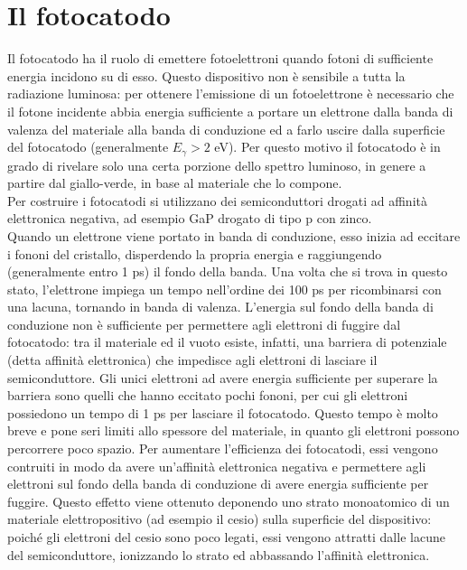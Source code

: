 \section{Il fotocatodo}
Il fotocatodo ha il ruolo di emettere fotoelettroni quando fotoni di sufficiente energia incidono su di esso.
Questo dispositivo non \`e sensibile a tutta la radiazione luminosa: 
per ottenere l'emissione di un fotoelettrone \`e necessario che il fotone incidente
abbia energia sufficiente a portare un elettrone dalla banda di valenza del materiale alla
banda di conduzione ed a farlo uscire dalla superficie del fotocatodo (generalmente $E_{\gamma} > 2$ eV).
Per questo motivo il fotocatodo \`e in grado di rivelare solo una certa porzione dello spettro
luminoso, in genere a partire dal giallo-verde, in base al materiale che lo compone. \\
Per costruire i fotocatodi si utilizzano dei semiconduttori drogati ad affinit\`a elettronica negativa, ad esempio GaP drogato di tipo p con zinco.\\
Quando un elettrone viene portato in banda di conduzione, esso inizia ad eccitare i fononi del cristallo,
disperdendo la propria energia e raggiungendo (generalmente entro 1 ps) il fondo della banda.
Una volta che si trova in questo stato, l'elettrone impiega un tempo nell'ordine dei 100 ps per ricombinarsi con una
lacuna, tornando in banda di valenza.
L'energia sul fondo della banda di conduzione non \`e sufficiente per permettere agli elettroni di fuggire dal fotocatodo:
tra il materiale ed il vuoto esiste, infatti, una barriera di potenziale (detta affinit\`a elettronica) che impedisce agli elettroni di lasciare il semiconduttore.
Gli unici elettroni ad avere energia sufficiente per superare la barriera sono quelli che
hanno eccitato pochi fononi, per cui gli elettroni possiedono un tempo di 1 ps per lasciare il fotocatodo.
Questo tempo \`e molto breve e pone seri limiti allo spessore del materiale, in quanto gli elettroni possono percorrere poco spazio.
Per aumentare l'efficienza dei fotocatodi, essi vengono contruiti in modo da avere un'affinit\`a elettronica negativa e permettere agli elettroni sul fondo della banda di conduzione di avere energia sufficiente per fuggire.
Questo effetto viene ottenuto deponendo uno strato monoatomico di un materiale elettropositivo (ad esempio il cesio) sulla superficie del dispositivo:
poich\'e gli elettroni del cesio sono poco legati, essi vengono attratti dalle lacune del semiconduttore, ionizzando lo strato ed abbassando l'affinit\`a elettronica.
